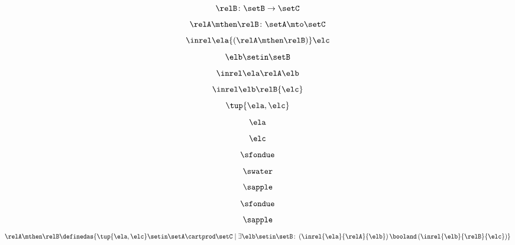 \begin{forslides}
\begin{equation}\label{eq:slides_session2_rel_84}
\relB \colon \setB \to \setC
\end{equation}
 \begin{equation}\label{eq:slides_session2_rel_85}
\relA \mthen \relB \colon \setA \mto \setC
\end{equation}
\begin{equation}\label{eq:slides_session2_rel_86}
\inrel \ela {(\relA \mthen \relB)} \elc
\end{equation}
 \begin{equation}\label{eq:slides_session2_rel_87}
\elb \setin \setB
\end{equation}
\begin{equation}\label{eq:slides_session2_rel_88}
\inrel \ela \relA \elb 
\end{equation}
 \begin{equation}\label{eq:slides_session2_rel_89}
\inrel \elb \relB{\elc}
\end{equation}
\begin{equation}\label{eq:slides_session2_rel_90}
\tup{\ela,\elc}
\end{equation}
 \begin{equation}\label{eq:slides_session2_rel_91}
\ela
\end{equation}
\begin{equation}\label{eq:slides_session2_rel_92}
\elc
\end{equation}
 \begin{equation}\label{eq:slides_session2_rel_93}
\sfondue
\end{equation}
\begin{equation}\label{eq:slides_session2_rel_94}
\swater
\end{equation}
 \begin{equation}\label{eq:slides_session2_rel_95}
\sapple
\end{equation}
\begin{equation}\label{eq:slides_session2_rel_96}
\sfondue
\end{equation}
 \begin{equation}\label{eq:slides_session2_rel_97}
\sapple
\end{equation}
\begin{equation}\label{eq:slides_session2_rel_98}
 \relA \mthen \relB \definedas \{\tup{\ela,\elc} \setin \setA \cartprod \setC \mid  \exists \elb \setin \setB \colon \left(\inrel{\ela}{\relA}{\elb} \right) \booland \left(\inrel{\elb}{\relB}{\elc}\right)\}
\end{equation}


\end{forslides}
